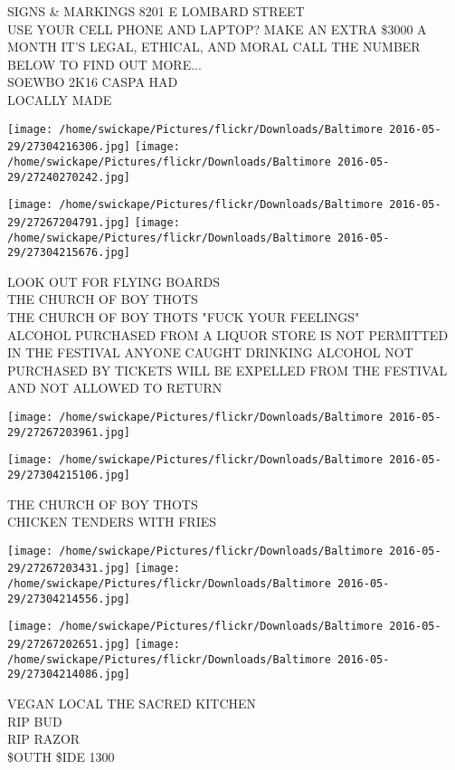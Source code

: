 \documentclass[10pt,letterpaper]{article}
\begin{document}
SIGNS \& MARKINGS 8201 E LOMBARD STREET\\
USE YOUR CELL PHONE AND LAPTOP?  MAKE AN EXTRA \$3000 A MONTH IT'S LEGAL, ETHICAL, AND MORAL CALL THE NUMBER BELOW TO FIND OUT MORE...\\
SOEWBO 2K16 CASPA HAD\\
LOCALLY MADE
\pagebreak

\texttt{[image: /home/swickape/Pictures/flickr/Downloads/Baltimore 2016-05-29/27304216306.jpg]}
\texttt{[image: /home/swickape/Pictures/flickr/Downloads/Baltimore 2016-05-29/27240270242.jpg]}

\texttt{[image: /home/swickape/Pictures/flickr/Downloads/Baltimore 2016-05-29/27267204791.jpg]}
\texttt{[image: /home/swickape/Pictures/flickr/Downloads/Baltimore 2016-05-29/27304215676.jpg]}

LOOK OUT FOR FLYING BOARDS\\
THE CHURCH OF BOY THOTS\\
THE CHURCH OF BOY THOTS "FUCK YOUR FEELINGS"\\
ALCOHOL PURCHASED FROM A LIQUOR STORE IS NOT PERMITTED IN THE FESTIVAL ANYONE CAUGHT DRINKING ALCOHOL NOT PURCHASED BY TICKETS WILL BE EXPELLED FROM THE FESTIVAL AND NOT ALLOWED TO RETURN
\pagebreak

\texttt{[image: /home/swickape/Pictures/flickr/Downloads/Baltimore 2016-05-29/27267203961.jpg]}

\vspace{0.25in}
\texttt{[image: /home/swickape/Pictures/flickr/Downloads/Baltimore 2016-05-29/27304215106.jpg]}

THE CHURCH OF BOY THOTS\\
CHICKEN TENDERS WITH FRIES
\pagebreak

\texttt{[image: /home/swickape/Pictures/flickr/Downloads/Baltimore 2016-05-29/27267203431.jpg]}
\texttt{[image: /home/swickape/Pictures/flickr/Downloads/Baltimore 2016-05-29/27304214556.jpg]}

\texttt{[image: /home/swickape/Pictures/flickr/Downloads/Baltimore 2016-05-29/27267202651.jpg]}
\texttt{[image: /home/swickape/Pictures/flickr/Downloads/Baltimore 2016-05-29/27304214086.jpg]}

VEGAN LOCAL THE SACRED KITCHEN\\
RIP BUD\\
RIP RAZOR\\
\$OUTH \$IDE 1300
\pagebreak
\end{document}

